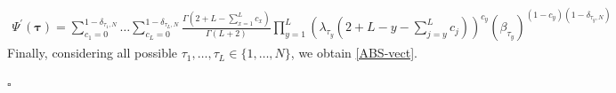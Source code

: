 \documentclass[10pt]{article}
\numberwithin{equation}{section}
\numberwithin{equation}{subsection}
\begin{document}
\begin{equation}\label{elementsABS}
	\begin{split}
		\Psi^{'}(\bm{\tau})=\sum_{c_{1}=0}^{1-\delta_{\tau_{1},N}}\ldots\sum_{c_{L}=0}^{1-\delta_{\tau_{L},N}}\frac{\Gamma(2+L-\sum_{x=1}^{L}c_{x})}{\Gamma(L+2)}\prod_{y=1}^{L}\left(\lambda_{\tau_{y}}\left(2+L-y-\sum_{j=y}^{L}c_{j}\right)\right)^{c_{y}}\left(\beta_{\tau_{y}}\right)^{(1-c_{y})(1-\delta_{\tau_{y},N})}
	\end{split}
\end{equation} 
Finally, considering all possible $\tau_{1},\ldots,\tau_{L}\in \{1,\ldots,N\}$, we obtain \eqref{ABS-vect}.
\begin{flushright}
    $\square$
\end{flushright}
\end{document}
